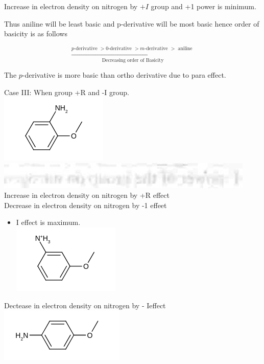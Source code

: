 \documentclass[10pt]{article}
\begin{document}
Increase in electron density on nitrogen by $+I$ group and +1 power is minimum.

Thus aniline will be least basic and p-derivative will be most basic hence order of basicity is as follows

$$
\xrightarrow[\text { Decreasing order of Basicity }]{p \text {-derivative }>0 \text {-derivative }>m \text {-derivative }>\text { aniline }}
$$

The $p$-derivative is more basic than ortho derivative due to para effect.

Case III: When group +R and -I group.\\
\includegraphics{smile-147c05a7ad78ef90978034ae2634ac784d713c23}\\
\includegraphics[max width=\textwidth, center]{2025_01_28_8470952b98110cec3aabg-080}\\
Increase in electron density on nitrogen by +R effect\\
Decrease in electron density on nitrogen by -1 effeet

\begin{itemize}
  \item I effect is maximum.\\
\includegraphics{smile-73dfc48458702461b67bcd8a3682a9e437007065}
\end{itemize}

Dectease in electron density on nitrogen by - Ieffect\\
\includegraphics{smile-327aa0306441d63c4736dd014af80c118ba59eee}
\end{document}
